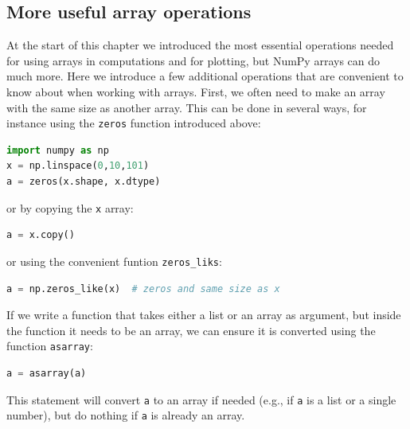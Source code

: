 \documentclass[graybox,envcountchap,sectrefs,final]{svmonodo}
\begin{document}
\subsection{More useful array operations}
At the start of this chapter we introduced the most essential operations needed for using arrays in computations and
for plotting, but NumPy arrays can do much more. Here we introduce a few additional operations that are convenient
to know about when working with arrays. First, we often need to make an array with the same size as another array. This can
be done in several ways, for instance using the \texttt{zeros} function introduced above:
\begin{lstlisting}[language=Python,style=blue1]
import numpy as np
x = np.linspace(0,10,101)
a = zeros(x.shape, x.dtype)
\end{lstlisting}
or by copying the \texttt{x} array:
\begin{lstlisting}[language=Python,style=blue1]
a = x.copy()
\end{lstlisting}
or using the convenient funtion \Verb!zeros_liks!:
\begin{lstlisting}[language=Python,style=blue1]
a = np.zeros_like(x)  # zeros and same size as x
\end{lstlisting}
If we write a function that takes either a list or an array as argument, but inside the function it needs to be an array,
we can ensure it is converted using the function \texttt{asarray}:
\begin{lstlisting}[language=Python,style=blue1]
a = asarray(a)
\end{lstlisting}
This statement will convert \texttt{a} to an array if needed (e.g., if \texttt{a} is a list or a single number), but do nothing if
\texttt{a} is already an array.
\end{document}
